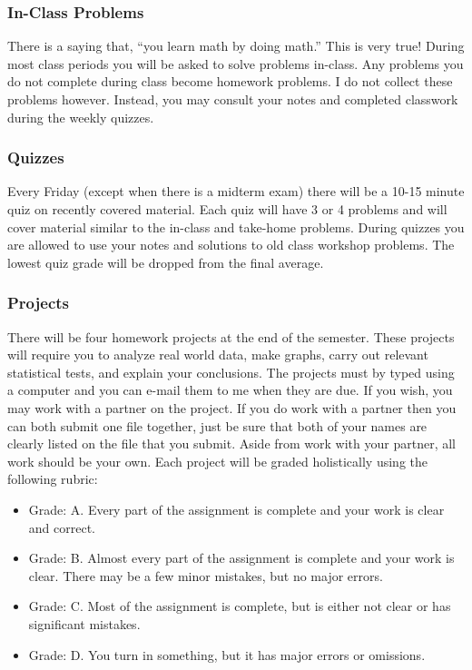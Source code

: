 \documentclass[10pt]{article}
\begin{document}
\subsubsection*{In-Class Problems}

There is a saying that, “you learn math by doing math.” This is very true! During most class periods you will be asked to solve problems in-class. Any problems you do not complete during class become homework problems. I do not collect these problems however. Instead, you may consult your notes and completed classwork during the weekly quizzes.


\subsubsection*{Quizzes}

Every Friday (except when there is a midterm exam) there will be a 10-15 minute quiz on recently covered material. Each quiz will have 3 or 4 problems and will cover material similar to the in-class and take-home problems. During quizzes you are allowed to use your notes and solutions to old class workshop problems. The lowest quiz grade will be dropped from the final average.

\subsubsection*{Projects}

There will be four homework projects at the end of the semester. These projects will require you to analyze real world data, make graphs, carry out relevant statistical tests, and explain your conclusions. The projects must by typed using a computer and you can e-mail them to me when they are due. If you wish, you may work with a partner on the project. If you do work with a partner then you can both submit one file together, just be sure that both of your names are clearly listed on the file that you submit. Aside from work with your partner, all work should be your own. Each project will be graded holistically using the following rubric:

\begin{itemize}
\item Grade: A. Every part of the assignment is complete and your work is clear and correct.
\item Grade: B. Almost every part of the assignment is complete and your work is clear. There may be a few minor mistakes, but no major errors.
\item Grade: C. Most of the assignment is complete, but is either not clear or has significant mistakes.
\item Grade: D. You turn in something, but it has major errors or omissions.
\end{itemize}
\end{document}
